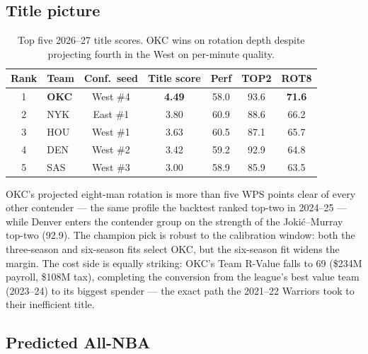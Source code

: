 \documentclass[11pt]{article}
\begin{document}
\subsection{Title picture}

\begin{table}[h]\centering
\caption{Top five 2026--27 title scores. OKC wins on rotation depth despite
projecting fourth in the West on per-minute quality.}
\begin{tabular}{clccccc}
\toprule
Rank & Team & Conf.\ seed & Title score & Perf & TOP2 & ROT8 \\
\midrule
1 & \textbf{OKC} & West \#4 & \textbf{4.49} & 58.0 & 93.6 & \textbf{71.6} \\
2 & NYK & East \#1 & 3.80 & 60.9 & 88.6 & 66.2 \\
3 & HOU & West \#1 & 3.63 & 60.5 & 87.1 & 65.7 \\
4 & DEN & West \#2 & 3.42 & 59.2 & 92.9 & 64.8 \\
5 & SAS & West \#3 & 3.00 & 58.9 & 85.9 & 63.5 \\
\bottomrule
\end{tabular}
\end{table}

OKC's projected eight-man rotation is more than five WPS points clear of every
other contender --- the same profile the backtest ranked top-two in 2024--25
--- while Denver enters the contender group on the strength of the
Joki\'c--Murray top-two (92.9). The champion pick is robust to the calibration
window: both the three-season and six-season fits select OKC, but the
six-season fit widens the margin. The cost side is equally striking: OKC's
Team R-Value falls to 69 (\$234M payroll, \$108M tax), completing the
conversion from the league's best value team (2023--24) to its biggest
spender --- the exact path the 2021--22 Warriors took to their inefficient
title.

\subsection{Predicted All-NBA}
\end{document}
